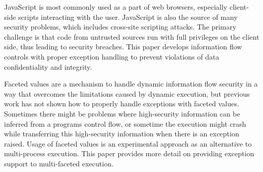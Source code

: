 JavaScript is most commonly used as a part of web browsers,  especially client-side scripts interacting with the user. JavaScript is also the source of many security problems, which includes cross-site scripting attacks. The primary challenge is that code from untrusted sources run with full privileges on the client side, thus leading to security breaches. This paper develops information flow controls with proper exception handling to prevent violations of data confidentiality and integrity.

Faceted values are a mechanism to handle dynamic information flow security in a way that overcomes the limitations caused by dynamic execution, but previous work has not shown how to properly handle exceptions with faceted values. Sometimes there might be problems where high-security information can be inferred from a program\textquotesingle s control flow, or sometime the execution might crash while transferring this high-security information when there is an exception raised. Usage of faceted values is an experimental approach as an alternative to multi-process execution. This paper provides more detail on providing exception support to multi-faceted execution.